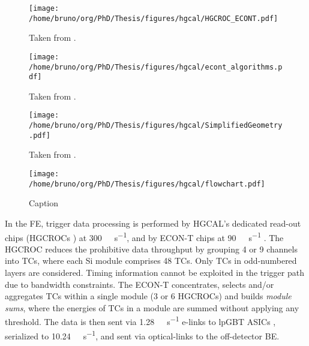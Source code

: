 \documentclass[11pt]{article}
\begin{document}
\begin{figure}
\texttt{[image: /home/bruno/org/PhD/Thesis/figures/hgcal/HGCROC\_ECONT.pdf]}
\caption{\label{fig:hgcroc_econt}Taken from \cite{bruno_chep23}.}
\end{figure}

\begin{figure}
\texttt{[image: /home/bruno/org/PhD/Thesis/figures/hgcal/econt\_algorithms.pdf]}
\caption{\label{fig:econt_algorithms}Taken from \cite{bruno_chep23}.}
\end{figure}

\begin{figure}
\texttt{[image: /home/bruno/org/PhD/Thesis/figures/hgcal/SimplifiedGeometry.pdf]}
\caption{\label{fig:econt_algorithms}Taken from \cite{bruno_chep23}.}
\end{figure}

\begin{figure}
\texttt{[image: /home/bruno/org/PhD/Thesis/figures/hgcal/flowchart.pdf]}
\caption{\label{fig:econt_algorithms}Caption}
\end{figure}

In the \ac{FE}, trigger data processing is performed by \ac{HGCAL}'s dedicated read-out chips (\acp{HGCROC} \cite{hgcroc}) at \SI{300}{\tera\byte\per\second}, and by \ac{ECON-T} chips at \SI{90}{\tera\byte\per\second} \cite{econ,hgcalTDR}.
The \ac{HGCROC} reduces the prohibitive data throughput by grouping 4 or 9 channels into \acp{TC}, where each \ac{Si} module comprises 48 \acp{TC}.
Only \acp{TC} in odd-numbered layers are considered.
Timing information cannot be exploited in the trigger path due to bandwidth constraints.
The ECON-T concentrates, selects and/or aggregates TCs within a single module (3 or 6 \acp{HGCROC}) and builds \textit{module sums}, where the energies of TCs in a module are summed without applying any threshold.
The data is then sent via \SI{1.28}{\giga\bit\per\second} e-links to lpGBT ASICs \cite{lpgbt}, serialized to \SI{10.24}{\giga\bit\per\second}, and sent via optical-links \cite{vtrxp} to the off-detector \ac{BE}.
\end{document}
